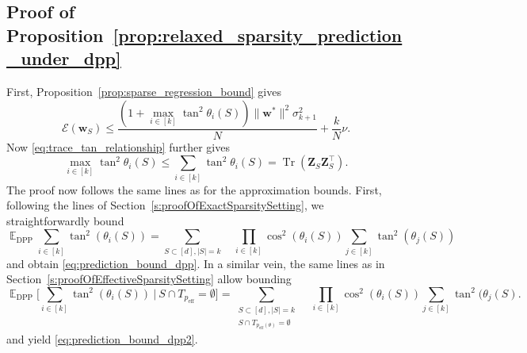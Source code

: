 \documentclass[twoside,11pt]{book}
\numberwithin{theorem}{chapter}
\numberwithin{definition}{chapter}
\numberwithin{proposition}{chapter}
\numberwithin{corollary}{chapter}
\numberwithin{example}{chapter}
\numberwithin{lemma}{chapter}
\numberwithin{assumption}{chapter}
\DeclareMathOperator{\Tr}{Tr}
\DeclareMathOperator{\DPP}{\mathrm{DPP}}
\DeclareMathOperator{\eff}{\mathrm{eff}}
\DeclareMathOperator{\Tran}{\intercal}
\DeclareMathOperator{\EX}{\mathbb{E}}
\begin{document}
\subsection{Proof of Proposition~\ref{prop:relaxed_sparsity_prediction_under_dpp}}
First, Proposition~\ref{prop:sparse_regression_bound} gives
\begin{equation}
    	\mathcal{E}(\bm{w}_{S})  \leq \frac{(1+\max\limits_{i \in [k]} \tan^{2}\theta_{i}(S))	\|\bm{w}^{*}\|^{2}\sigma_{k+1}^{2}}{N} + \frac{k}{N}\nu.
\end{equation}
Now \eqref{eq:trace_tan_relationship} further gives
\begin{equation}
	\max\limits_{i \in [k]} \tan^{2}\theta_{i}(S) \leq \sum\limits_{i \in [k]} \tan^{2}\theta_{i}(S) = \Tr(\bm{Z}_{S}^{}\bm{Z}_{S}	^{\Tran}).
\end{equation}
The proof now follows the same lines as for the approximation bounds. First, following the lines of Section~\ref{s:proofOfExactSparsitySetting}, we straightforwardly bound
\begin{equation}
	\EX_{\DPP} \sum\limits_{i \in [k]} \tan^{2}(\theta_{i}(S)) = \sum\limits_{S \subset [d], |S| = k} \quad \prod\limits_{i \in 	[k]} 	\cos^{2}(\theta_{i}(S)) \sum_{j \in [k]}\tan^{2}(\theta_{j}(S))
\end{equation}
and obtain \eqref{eq:prediction_bound_dpp}. In a similar vein, the same lines as in  Section~\ref{s:proofOfEffectiveSparsitySetting} allow bounding
\begin{equation}
	\EX_{\DPP} \bigg[ \sum\limits_{i \in [k]}  \tan^{2}(\theta_{i}(S)) \: | \: S \cap T_{p_{\eff}} = \emptyset \bigg] = 			\sum\limits_{\substack{S \subset [d],|S| = k\\  S \cap T_{p_{\eff}(\theta)} = \emptyset}} \quad \prod\limits_{i \in [k]} 	\cos^{2}	(\theta_{i}(S)) \sum_{j \in [k]}\tan^{2}(\theta_{j}(S).
\end{equation}
and yield \eqref{eq:prediction_bound_dpp2}.

\end{document}
